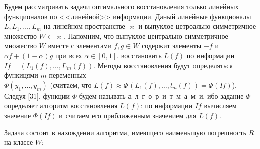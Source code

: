 \documentclass{book}
\begin{document}
\noindent Будем рассматривать задачи оптимального восстановления только линейных функционалов по <<линейной>> информации. Даный линейные функционалы $L, L_1, \dots, L_m$ на линейном пространстве $\varkappa$ и выпуклое цетроально-симметричное множество $W\subset\varkappa$. Напомним, что выпуклое центрально-симметричное множество $W$ вместе с элементами $f, g\in W$ содержит элементы $-f$ и $\alpha f+(1-\alpha)g$ при всех $\alpha\in[0, 1]$.
 восстановить $L(f)$ по информации $If=(L_1(f), \dots, L_m(f))$. Методы восстановления будут определяться функицями $m$ переменных \\\noindent $\Phi(y_1, \dots, y_m)$ (считаем, что $L(f)\approx\Phi(L_1(f), \dots, l_m(f))=\Phi(If)$). Следуя [31], функции $\Phi$ будем называть а~л~г~о~р~и~т~м~а~м~и, ибо задание $\Phi$ определяет алгоритм восстановления $L(f)$: по информации $If$ вычисляем значение $\Phi(If)$ и считаем его приближенным значением для $L(f)$.
\par Задача состоит в нахождении алгоритма, имеющего наименьшую погрешность $R$ на классе $W$:
\end{document}
